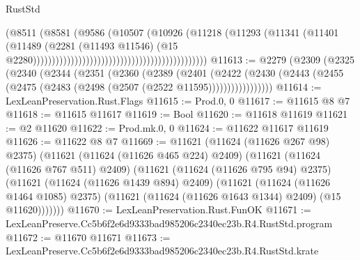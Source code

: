 \begin{lexlean}{RustStd}
\begin{coremodule}
                                                                        (@8511
                                                                          (@8581
                                                                            (@9586
                                                                              (@10507
                                                                                (@10926
                                                                                  (@11218
                                                                                    (@11293
                                                                                      (@11341
                                                                                        (@11401
                                                                                          (@11489
                                                                                            (@2281
                                                                                              (@11493
                                                                                                @11546)
                                                                                              (@15
                                                                                                @2280))))))))))))))))))))))))))))))))))))))))))))))
@11613 := @2279
    (@2309
      (@2325
        (@2340
          (@2344
            (@2351
              (@2360
                (@2389
                  (@2401
                    (@2422
                      (@2430
                        (@2443 (@2455 (@2475 (@2483 (@2498 (@2507 (@2522 @11595)))))))))))))))))
@11614 := LexLeanPreservation.Rust.Flags
@11615 := Prod.{0, 0}
@11617 := @11615 @8 @7
@11618 := @11615 @11617
@11619 := Bool
@11620 := @11618 @11619
@11621 := @2 @11620
@11622 := Prod.mk.{0, 0}
@11624 := @11622 @11617 @11619
@11626 := @11622 @8 @7
@11669 := @11621
    (@11624 (@11626 @267 @98) @2375)
    (@11621
      (@11624 (@11626 @465 @224) @2409)
      (@11621
        (@11624 (@11626 @767 @511) @2409)
        (@11621
          (@11624 (@11626 @795 @94) @2375)
          (@11621
            (@11624 (@11626 @1439 @894) @2409)
            (@11621
              (@11624 (@11626 @1464 @1085) @2375)
              (@11621 (@11624 (@11626 @1643 @1344) @2409) (@15 @11620)))))))
@11670 := LexLeanPreservation.Rust.FunOK
@11671 := LexLeanPreserve.Cc5b6f2e6d9333bad985206c2340ec23b.R4.RustStd.program
@11672 := @11670 @11671
@11673 := LexLeanPreserve.Cc5b6f2e6d9333bad985206c2340ec23b.R4.RustStd.krate

\end{coremodule}
\end{lexlean}
